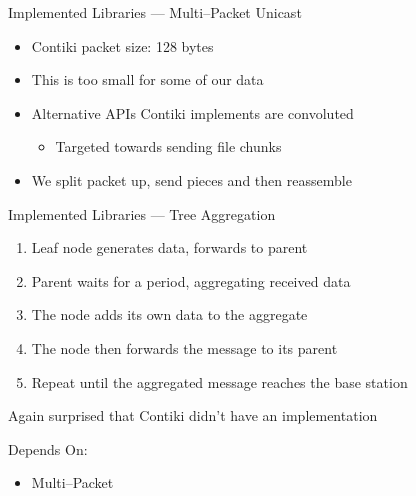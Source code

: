 \documentclass[usenames,dvipsnames]{beamer}
\begin{document}
\begin{frame}{Implemented Libraries --- Multi--Packet Unicast}
	\begin{itemize}
		\item Contiki packet size: 128 bytes
		\item This is too small for some of our data
		\item Alternative APIs Contiki implements are convoluted
			\begin{itemize}
				\item Targeted towards sending file chunks
			\end{itemize}
		\item We split packet up, send pieces and then reassemble
	\end{itemize}
\end{frame}

\begin{frame}{Implemented Libraries --- Tree Aggregation}
	\begin{enumerate}
		\item Leaf node generates data, forwards to parent
		\item Parent waits for a period, aggregating received data
		\item The node adds its own data to the aggregate
		\item The node then forwards the message to its parent
		\item Repeat until the aggregated message reaches the base station
	\end{enumerate}
\vspace{1em}
Again surprised that Contiki didn't have an implementation\newline

Depends On:
	\begin{itemize}
		\item Multi--Packet
	\end{itemize}
\end{frame}
\end{document}
